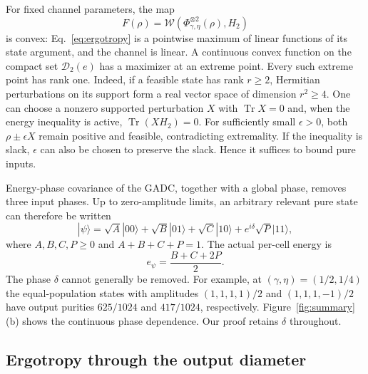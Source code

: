 \documentclass[pra,aps,twocolumn,nofootinbib,superscriptaddress]{revtex4-2}
\newcommand{\Tr}{\operatorname{Tr}}
\newcommand{\W}{\mathcal{W}}
\newcommand{\Dset}{\mathcal{D}}
\begin{document}
For fixed channel parameters, the map
\begin{equation}
F(\rho)=\W(\Phi_{\gamma,\eta}^{\otimes2}(\rho),H_2)
\end{equation}
is convex: Eq.~\eqref{eq:ergotropy} is a pointwise maximum of linear
functions of its state argument, and the channel is linear.  A continuous
convex function on the compact set $\Dset_2(e)$ has a maximizer at an extreme
point.  Every such extreme point has rank one.  Indeed, if a feasible state
has rank $r\geq2$, Hermitian perturbations on its support form a real vector
space of dimension $r^2\geq4$.  One can choose a nonzero supported
perturbation $X$ with $\Tr X=0$ and, when the energy inequality is active,
$\Tr(XH_2)=0$.  For sufficiently small $\epsilon>0$, both
$\rho\pm\epsilon X$ remain positive and feasible, contradicting extremality.
If the inequality is slack, $\epsilon$ can also be chosen to preserve the
slack.  Hence it suffices to bound pure inputs.

Energy-phase covariance of the GADC, together with a global phase, removes
three input phases.  Up to zero-amplitude limits, an arbitrary relevant pure
state can therefore be written
\begin{equation}
|\psi\rangle=\sqrt A|00\rangle+\sqrt B|01\rangle
+\sqrt C|10\rangle+e^{i\delta}\sqrt P|11\rangle,
\label{eq:pure-state}
\end{equation}
where $A,B,C,P\geq0$ and $A+B+C+P=1$.  The actual per-cell energy is
\begin{equation}
 e_\psi=\frac{B+C+2P}{2}.
\label{eq:actual-energy}
\end{equation}
The phase $\delta$ cannot generally be removed.  For example, at
$(\gamma,\eta)=(1/2,1/4)$ the equal-population states with amplitudes
$(1,1,1,1)/2$ and $(1,1,1,-1)/2$ have output purities $625/1024$ and
$417/1024$, respectively.  Figure~\ref{fig:summary}(b) shows the continuous
phase dependence.  Our proof retains $\delta$ throughout.

\subsection{Ergotropy through the output diameter}
\end{document}
